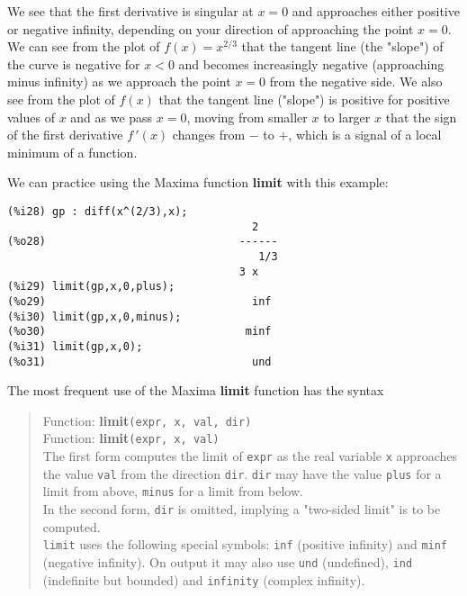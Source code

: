 \documentclass[12pt]{article}
\begin{document}
\newpage
%



We see that the first derivative is singular at $x=0$ and approaches either
  positive or negative infinity, depending on your direction of approaching
  the point $x=0$.
We can see from the plot of $f(x) = x^{2/3}$ that the tangent line (the "slope") of the curve
  is negative for $x<0$ and becomes increasingly negative (approaching minus infinity)
  as we approach the point $x=0$ from the negative side.
We also see from the plot of $f(x)$ that the tangent line ("slope") is positive for
  positive values of $x$ and as we pass $x=0$, moving from smaller $x$ to larger $x$
  that the sign of the first derivative $f\,'(x)$ changes from $-$ to $+$, which
  is a signal of a local minimum of a function.

\smallskip
We can practice using the Maxima function \textbf{limit} with this example:  
\small
\begin{verbatim}
(%i28) gp : diff(x^(2/3),x);
                                      2
(%o28)                              ------
                                       1/3
                                    3 x
(%i29) limit(gp,x,0,plus);
(%o29)                                inf
(%i30) limit(gp,x,0,minus);
(%o30)                               minf
(%i31) limit(gp,x,0);
(%o31)                                und
\end{verbatim}
\normalsize
The most frequent use of the Maxima \textbf{limit} function has the syntax  
\small
\begin{quote}
Function: \textbf{limit}\verb|(expr, x, val, dir)|\\
Function: \textbf{limit}\verb|(expr, x, val) |\\

The first form computes the limit of \verb|expr| as the real variable \verb|x| approaches
 the value \verb|val| from the direction \verb|dir|.
\verb|dir| may have the value \verb|plus| for a limit from above,
  \verb|minus| for a limit from below.\\
In the second form, \verb|dir| is omitted,  implying
   a "two-sided limit" is to be computed. \\
\verb|limit| uses the following special symbols: \verb|inf| (positive infinity)
   and \verb|minf| (negative infinity).
On output it may also use \verb|und| (undefined), \verb|ind| (indefinite but bounded)
  and \verb|infinity| (complex infinity). \\
\end{quote}
\normalsize
\end{document}
